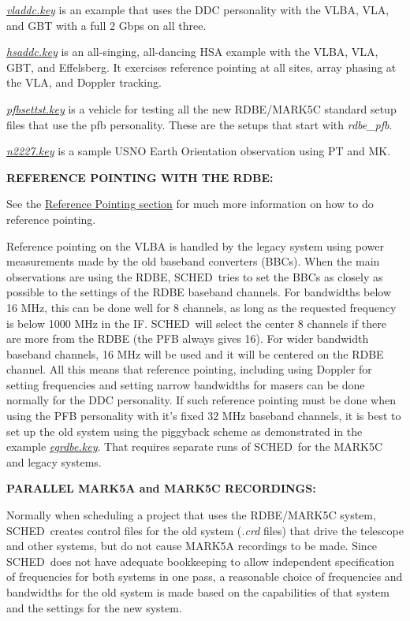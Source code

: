 \documentclass{report}
\newcommand{\schedb}{{\sc SCHED~}}
\begin{document}
{\href{examples/vladdc.key}{{\sl vladdc.key}}} is an
example that uses the DDC personality with the VLBA, VLA, and GBT 
with a full 2 Gbps on all three.

{\href{examples/hsaddc.key}{{\sl hsaddc.key}}} is an
all-singing, all-dancing HSA example with the VLBA, VLA, GBT, and
Effelsberg.  It exercises reference pointing at all sites, array
phasing at the VLA, and Doppler tracking.

{\href{examples/pfbsettst.key}{{\sl pfbsettst.key}}} is a
vehicle for testing all the new RDBE/MARK5C standard setup files that
use the pfb personality.  These are the setups that start with 
{\sl rdbe\_pfb}.

{\href{examples/n2227.key}{{\sl n2227.key}}} is a
sample USNO Earth Orientation observation using PT and MK.


{\bf REFERENCE POINTING WITH THE RDBE:}

See the 
{\hyperref[SEC:REFPOINT]{Reference Pointing section}} for much
more information on how to do reference pointing.

Reference pointing on the VLBA is handled by the legacy system using
power measurements made by the old baseband converters (BBCs).  When
the main observations are using the RDBE, \schedb tries to set the
BBCs as closely as possible to the settings of the RDBE baseband
channels.  For bandwidths below 16 MHz, this can be done well for 8
channels, as long as the requested frequency is below 1000 MHz in the
IF.  \schedb will select the center 8 channels if there are more from
the RDBE (the PFB always gives 16).  For wider bandwidth baseband
channels, 16 MHz will be used and it will be centered on the RDBE
channel.  All this means that reference pointing, including using
Doppler for setting frequencies and setting narrow bandwidths for
masers can be done normally for the DDC personality.  If such
reference pointing must be done when using the PFB personality with
it's fixed 32 MHz baseband channels, it is best to set up the old
system using the piggyback scheme as demonstrated in the example
{\href{examples/egrdbe.key}{{\sl egrdbe.key}}}.  That
requires separate runs of \schedb for the MARK5C and legacy systems.


{\bf PARALLEL MARK5A and MARK5C RECORDINGS:}

Normally when scheduling a project that uses the RDBE/MARK5C system,
\schedb creates control files for the old system ({\sl .crd} files)
that drive the telescope and other systems, but do not cause MARK5A
recordings to be made.  Since \schedb does not have adequate bookkeeping
to allow independent specification of frequencies for both systems
in one pass, a reasonable choice of frequencies and bandwidths for 
the old system is made based on the capabilities of that system and
the settings for the new system.  
\end{document}
